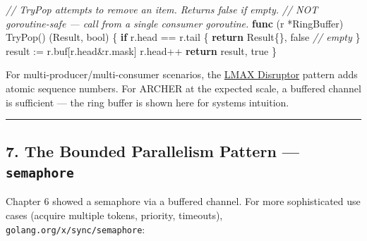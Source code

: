 \documentclass[
]{article}
\newenvironment{Shaded}{}{}
\newcommand{\CommentTok}[1]{\textcolor[rgb]{0.38,0.63,0.69}{\textit{#1}}}
\newcommand{\ControlFlowTok}[1]{\textcolor[rgb]{0.00,0.44,0.13}{\textbf{#1}}}
\newcommand{\DataTypeTok}[1]{\textcolor[rgb]{0.56,0.13,0.00}{#1}}
\newcommand{\KeywordTok}[1]{\textcolor[rgb]{0.00,0.44,0.13}{\textbf{#1}}}
\newcommand{\NormalTok}[1]{#1}
\newcommand{\OperatorTok}[1]{\textcolor[rgb]{0.40,0.40,0.40}{#1}}
\newcommand{\OtherTok}[1]{\textcolor[rgb]{0.00,0.44,0.13}{#1}}
\begin{document}
\begin{Shaded}
\begin{Highlighting}[]
\CommentTok{// TryPop attempts to remove an item. Returns false if empty.}
\CommentTok{// NOT goroutine{-}safe — call from a single consumer goroutine.}
\KeywordTok{func} \OperatorTok{(}\NormalTok{r }\OperatorTok{*}\NormalTok{RingBuffer}\OperatorTok{)}\NormalTok{ TryPop}\OperatorTok{()} \OperatorTok{(}\NormalTok{Result}\OperatorTok{,} \DataTypeTok{bool}\OperatorTok{)} \OperatorTok{\{}
    \ControlFlowTok{if}\NormalTok{ r}\OperatorTok{.}\NormalTok{head }\OperatorTok{==}\NormalTok{ r}\OperatorTok{.}\NormalTok{tail }\OperatorTok{\{}
        \ControlFlowTok{return}\NormalTok{ Result}\OperatorTok{\{\},} \OtherTok{false} \CommentTok{// empty}
    \OperatorTok{\}}
\NormalTok{    result }\OperatorTok{:=}\NormalTok{ r}\OperatorTok{.}\NormalTok{buf}\OperatorTok{[}\NormalTok{r}\OperatorTok{.}\NormalTok{head}\OperatorTok{\&}\NormalTok{r}\OperatorTok{.}\NormalTok{mask}\OperatorTok{]}
\NormalTok{    r}\OperatorTok{.}\NormalTok{head}\OperatorTok{++}
    \ControlFlowTok{return}\NormalTok{ result}\OperatorTok{,} \OtherTok{true}
\OperatorTok{\}}
\end{Highlighting}
\end{Shaded}

For multi-producer/multi-consumer scenarios, the
\href{https://lmax-exchange.github.io/disruptor/}{LMAX Disruptor}
pattern adds atomic sequence numbers. For ARCHER at the expected scale,
a buffered channel is sufficient --- the ring buffer is shown here for
systems intuition.

\begin{center}\rule{0.5\linewidth}{0.5pt}\end{center}

\hypertarget{the-bounded-parallelism-pattern-semaphore}{%
\subsection{\texorpdfstring{7. The Bounded Parallelism Pattern ---
\texttt{semaphore}}{7. The Bounded Parallelism Pattern --- semaphore}}\label{the-bounded-parallelism-pattern-semaphore}}

Chapter 6 showed a semaphore via a buffered channel. For more
sophisticated use cases (acquire multiple tokens, priority, timeouts),
\texttt{golang.org/x/sync/semaphore}:
\end{document}
